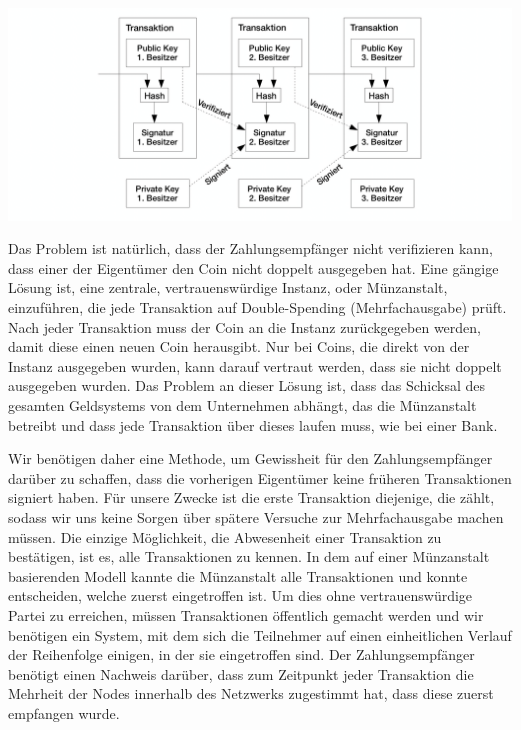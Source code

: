 \documentclass[9pt]{article}
\begin{document}
	\begin{center}
		\includegraphics[width=\textwidth]{pics/transactions.png}		
	\end{center}

	Das Problem ist natürlich, dass der Zahlungsempfänger nicht verifizieren kann, dass einer der Eigentümer den Coin nicht doppelt ausgegeben hat. Eine gängige Lösung ist, eine zentrale, vertrauenswürdige Instanz, oder Münzanstalt, einzuführen, die jede Transaktion auf Double-Spending (Mehrfachausgabe) prüft. Nach jeder Transaktion muss der Coin an die Instanz zurückgegeben werden, damit diese einen neuen Coin herausgibt. Nur bei Coins, die direkt von der Instanz ausgegeben wurden, kann darauf vertraut werden, dass sie nicht doppelt ausgegeben wurden. Das Problem an dieser Lösung ist, dass das Schicksal des gesamten Geldsystems von dem Unternehmen abhängt, das die Münzanstalt betreibt und dass jede Transaktion über dieses laufen muss, wie bei einer Bank.
	
	Wir benötigen daher eine Methode, um Gewissheit für den Zahlungsempfänger darüber zu schaffen, dass die vorherigen Eigentümer keine früheren Transaktionen signiert haben. Für unsere Zwecke ist die erste Transaktion diejenige, die zählt, sodass wir uns keine Sorgen über spätere Versuche zur Mehrfachausgabe machen müssen. Die einzige Möglichkeit, die Abwesenheit einer Transaktion zu bestätigen, ist es, alle Transaktionen zu kennen. In dem auf einer Münzanstalt basierenden Modell kannte die Münzanstalt alle Transaktionen und konnte entscheiden, welche zuerst eingetroffen ist. Um dies ohne vertrauenswürdige Partei zu erreichen, müssen Transaktionen öffentlich gemacht werden \cite{dai} und wir benötigen ein System, mit dem sich die Teilnehmer auf einen einheitlichen Verlauf der Reihenfolge einigen, in der sie eingetroffen sind. Der Zahlungsempfänger benötigt einen Nachweis darüber, dass zum Zeitpunkt jeder Transaktion die Mehrheit der Nodes innerhalb des Netzwerks zugestimmt hat, dass diese zuerst empfangen wurde.
\end{document}
